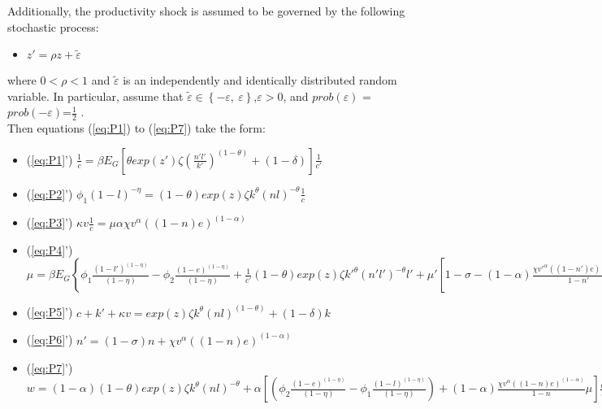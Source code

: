 \documentclass[english]{article}
\begin{document}
Additionally, the productivity shock is assumed to be governed by
the following stochastic process:
\begin{itemize}
\item $z'=\rho z+\tilde{\varepsilon}$
\end{itemize}
where $0<\rho<1$ and $\tilde{\varepsilon}$ is an independently and identically distributed random variable. In particular, assume that
$\tilde{\varepsilon}\in\left\{ -\varepsilon,\:\varepsilon\right\} $,$\varepsilon>0$, and $prob(\varepsilon)$ = $prob(-\varepsilon)$=$\frac{1}{2}$ . \\
Then equations (\ref{eq:P1}) to (\ref{eq:P7}) take the form:


\begin{itemize}
\item (\ref{eq:P1}') $\frac{1}{c}=\beta E_{G}\left[\theta exp(z')\zeta(\frac{n'l'}{k'})^{(1-\theta)}+(1-\delta)\right]\frac{1}{c'}$
\item (\ref{eq:P2}') $\phi_{1}\left(1-l\right)^{-\eta}=(1-\theta)exp(z)\zeta k^{\theta}(nl)^{-\theta}\frac{1}{c}$
\item (\ref{eq:P3}') $\kappa v\frac{1}{c}=\mu\alpha\chi v^{\alpha}((1-n)e)^{(1-\alpha)}$
\item (\ref{eq:P4}') $\mu=\beta E_{G}\left\{ \phi_{1}\frac{\left(1-l'\right)^{(1-\eta)}}{(1-\eta)}-\phi_{2}\frac{\left(1-e\right)^{(1-\eta)}}{(1-\eta)}+\frac{1}{c'}(1-\theta)exp(z)\zeta k'^{\theta}(n'l')^{-\theta}l'+\mu'\left[1-\sigma-(1-\alpha)\frac{\chi v'^{\alpha}((1-n')e)^{(1-\alpha)}}{1-n'}\right]\right\} $
\item (\ref{eq:P5}') $c+k'+\kappa v=exp(z)\zeta k^{\theta}(nl)^{(1-\theta)}+(1-\delta)k$
\item (\ref{eq:P6}') $n'=(1-\sigma)n+\chi v^{\alpha}((1-n)e)^{(1-\alpha)}$
\item {\small (\ref{eq:P7}') $w=(1-\alpha)(1-\theta)exp(z)\zeta k^{\theta}(nl)^{-\theta}+\alpha\left[\left(\phi_{2}\frac{\left(1-e\right)^{(1-\eta)}}{(1-\eta)}-\phi_{1}\frac{\left(1-l\right)^{(1-\eta)}}{(1-\eta)}\right)+(1-\alpha)\frac{\chi v{}^{\alpha}((1-n)e)^{(1-\alpha)}}{1-n}\mu\right]\frac{c}{l}$}{\small \par}
\end{itemize}
\end{document}
